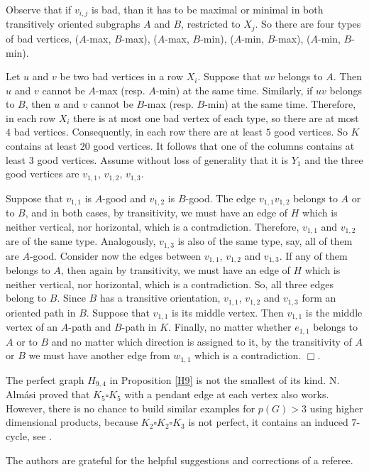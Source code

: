 \documentclass[12pt]{article}
\def\qed{\ifhmode\unskip\nobreak\fi\quad\ifmmode\Box\else$\Box$\fi}
\def\qed{\hfill $\Box$}
\begin{document}
Observe that if $v_{i,j}$ is bad, than it has to be maximal or minimal in both
transitively oriented subgraphs $A$ and $B$, restricted to $X_j$.
So there are four types of bad vertices, ($A$-max, $B$-max),
($A$-max, $B$-min),  ($A$-min, $B$-max),  ($A$-min, $B$-min).

Let $u$ and $v$ be two bad vertices
in a row $X_i$. Suppose that $uv$ belongs to $A$.
Then $u$ and $v$ cannot be $A$-max (resp. $A$-min) at the same time.
Similarly, if $uv$ belongs to $B$,
then $u$ and $v$ cannot be $B$-max (resp. $B$-min) at the same time.
Therefore, in each row $X_i$ there is at most one bad vertex of each type, so there are at most $4$ bad vertices.
Consequently, in each row there are at least $5$ good vertices.
So $K$ contains at least $20$ good vertices. It follows that one of the columns contains at least $3$ good vertices.
Assume without loss of generality that it is $Y_1$ and the three good vertices are $v_{1,1}$, $v_{1,2}$, $v_{1,3}$.

Suppose that $v_{1,1}$ is $A$-good and $v_{1,2}$ is $B$-good.
The edge $v_{1,1}v_{1,2}$ belongs to $A$ or to $B$, and in both cases, by transitivity,
we must have an edge of $H$ which is neither vertical, nor horizontal, which is a contradiction.
Therefore,  $v_{1,1}$ and $v_{1,2}$ are of the same type. Analogously, $v_{1,3}$ is also of the same type, say, all of them are $A$-good.
Consider now the edges between  $v_{1,1}$, $v_{1,2}$ and  $v_{1,3}$. If any of them belongs to $A$, then again  by transitivity,
we must have an edge of $H$ which is neither vertical, nor horizontal, which is a contradiction.
So, all three edges belong to $B$. Since $B$ has a transitive orientation,
$v_{1,1}$, $v_{1,2}$ and  $v_{1,3}$ form an oriented path in $B$. Suppose that $v_{1,1}$ is its middle vertex.
Then $v_{1,1}$ is the middle vertex of an $A$-path and $B$-path in $K$.
Finally, no matter whether $e_{1,1}$ belongs to $A$ or to $B$ and no matter which direction is assigned to it,
by the transitivity of $A$ or $B$ we must have another edge from $w_{1,1}$ which is a contradiction.
\qed.

The perfect graph $H_{9,4}$ in Proposition \ref{H9} is not the smallest of its kind.
N. Alm\'asi \cite{A24} proved that $K_5\square K_5$ with a pendant edge at each vertex also works.
However, there is no chance to build similar examples for $p(G)>3$ using higher dimensional products, because $K_2\square K_2\square K_3$ is not perfect, it contains an induced $7$-cycle, see \cite{KP}.
\medskip

The authors are grateful for the helpful suggestions and corrections of a referee.
\end{document}
